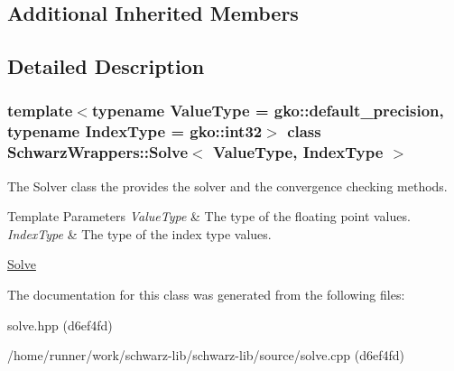 \subsection*{Additional Inherited Members}


\subsection{Detailed Description}
\subsubsection*{template$<$typename Value\+Type = gko\+::default\+\_\+precision, typename Index\+Type = gko\+::int32$>$\newline
class Schwarz\+Wrappers\+::\+Solve$<$ Value\+Type, Index\+Type $>$}

The Solver class the provides the solver and the convergence checking methods. 


\begin{DoxyTemplParams}{Template Parameters}
{\em Value\+Type} & The type of the floating point values. \\
\hline
{\em Index\+Type} & The type of the index type values.\\
\hline
\end{DoxyTemplParams}
\hyperlink{group__solve}{Solve} 

The documentation for this class was generated from the following files\+:\begin{DoxyCompactItemize}
\item 
solve.\+hpp (d6ef4fd)\item 
/home/runner/work/schwarz-\/lib/schwarz-\/lib/source/solve.\+cpp (d6ef4fd)\end{DoxyCompactItemize}
